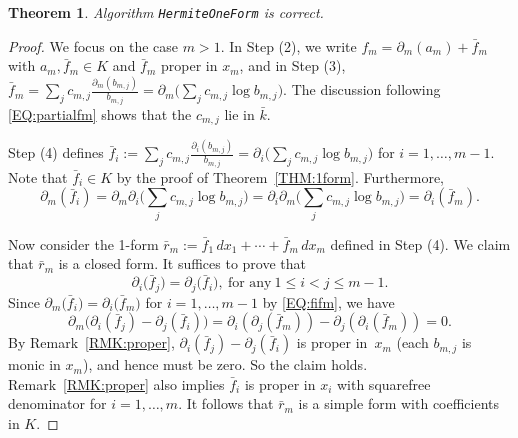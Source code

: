 \documentclass[10pt,a4paper]{amsart}
\newtheorem{thm}{Theorem}
\begin{document}
\begin{thm}
Algorithm {\tt HermiteOneForm} is correct.
\end{thm}

\begin{proof} We focus on the case $m > 1$.  In Step (2), we write $f_m = \partial_m(a_m) + \bar f_m$ with $a_m, \bar{f}_m \in K$ and $\bar{f}_m$  proper in $x_m$, and in Step (3), $\bar{f}_m = \sum_j c_{m, j} \frac{\partial_m(b_{m, j})}{b_{m,j}} = \partial_m\big(\sum_j c_{m, j} \log b_{m, j}\big)$.
The discussion following \eqref{EQ:partialfm} shows that the $c_{m,j}$ lie in $\bar k$.  

Step (4) defines $\bar f_i := \sum_j c_{m, j} \frac{\partial_i(b_{m, j})}{b_{m,j}} = \partial_i\big(\sum_j c_{m, j} \log b_{m, j}\big)$ for $i = 1,\ldots,m-1$.  Note that $\bar f_i \in K$ by the proof of Theorem~\ref{THM:1form}. Furthermore,
\begin{equation}\label{EQ:fifm}
\partial_m(\bar f_i) = \partial_m\partial_i\big({\textstyle\sum_j} c_{m, j} \log b_{m, j}\big) = \partial_i\partial_m\big({\textstyle\sum_j} c_{m, j} \log b_{m, j} \big) = \partial_i(\bar f_m).
\end{equation}

Now consider the 1-form $\bar{r}_m := \bar{f}_1 \, dx_1 + \cdots + \bar{f}_m \, dx_m$
defined in Step (4). We claim that $\bar r_m$ is a closed form.  It suffices to prove that  
\[
    \partial_i\bigl(\bar{f}_j\bigr) = \partial_j\bigl(\bar{f}_i\bigr), \ \text{for any}\ 1 \leq i < j \leq m-1.
\]
Since $\partial_m\bigl(\bar{f}_i\bigr) = \partial_i\bigl(\bar{f}_m\bigr)$ for $i = 1,\ldots,m-1$ by \eqref{EQ:fifm}, we have
\[
    \partial_m \bigl(\partial_i(\bar{f}_j)-\partial_j(\bar{f}_i)\bigr) = \partial_i(\partial_j(\bar{f}_m))-\partial_j(\partial_i(\bar{f}_m)) = 0.
\]
By Remark~\ref{RMK:proper}, $\partial_i(\bar{f}_j)-\partial_j(\bar{f}_i)$ is proper in~$x_m$ (each $b_{m,j}$ is monic in $x_m$), and hence must be zero. So the claim holds.   Remark~\ref{RMK:proper} also implies $\bar f_i$ is proper in $x_i$ with squarefree denominator for $i = 1,\dots,m$.  It follows that $\bar{r}_m$ is a simple form with coefficients in $K$.


\end{proof}
\end{document}
